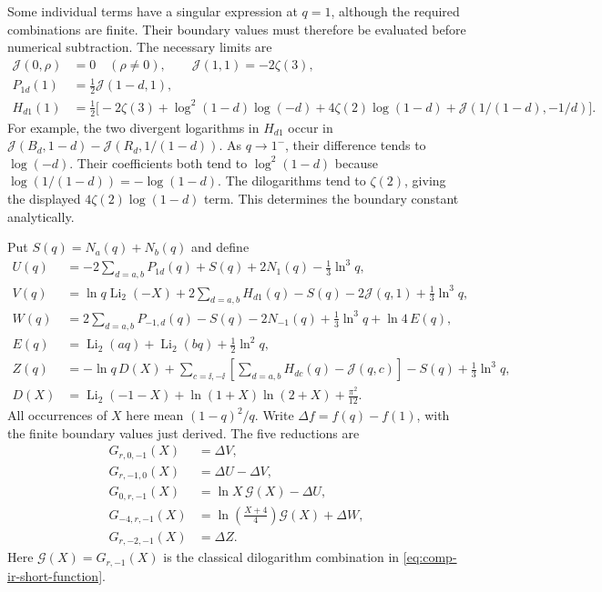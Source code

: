 Some individual terms have a singular expression at $q=1$, although
the required combinations are finite. Their boundary values must therefore
be evaluated before numerical subtraction. The necessary limits are
\begin{align}
 \mathcal J(0,\rho)&=0\quad(\rho\ne0),\qquad
 \mathcal J(1,1)=-2\zeta(3),\\
 P_{1d}(1)&=\tfrac12\mathcal J(1-d,1),\\
 H_{d1}(1)&=\tfrac12\bigl[-2\zeta(3)
       +\log^2(1-d)\log(-d)+4\zeta(2)\log(1-d)
       +\mathcal J(1/(1-d),-1/d)\bigr].
 \label{eq:comp-root-mixed-boundary}
\end{align}
For example, the two divergent logarithms in $H_{d1}$ occur in
$\mathcal J(B_d,1-d)-\mathcal J(R_d,1/(1-d))$.
As $q\to1^-$, their difference tends to $\log(-d)$.
Their coefficients both tend to $\log^2(1-d)$ because
$\log(1/(1-d))=-\log(1-d)$. The dilogarithms tend to
$\zeta(2)$, giving the displayed $4\zeta(2)\log(1-d)$ term.
This determines the boundary constant analytically.

Put $S(q)=N_a(q)+N_b(q)$ and define
\begin{align}
 U(q)&=-2\sum_{d=a,b}P_{1d}(q)+S(q)+2N_1(q)-\tfrac13\ln^3q,\\
 V(q)&=\ln q\operatorname{Li}_2(-X)
       +2\sum_{d=a,b}H_{d1}(q)-S(q)
       -2\mathcal J(q,1)+\tfrac13\ln^3q,\\
 W(q)&=2\sum_{d=a,b}P_{-1,d}(q)-S(q)-2N_{-1}(q)
       +\tfrac13\ln^3q+\ln4\,E(q),\\
 E(q)&=\operatorname{Li}_2(aq)+\operatorname{Li}_2(bq)
                 +\tfrac12\ln^2q,\\
 Z(q)&=-\ln q\,D(X)
       +\sum_{c=\ii,-\ii}\left[\sum_{d=a,b}H_{dc}(q)-\mathcal J(q,c)\right]
       -S(q)+\tfrac13\ln^3q,\\
 D(X)&=\operatorname{Li}_2(-1-X)+\ln(1+X)\ln(2+X)+\frac{\pi^2}{12}.
\end{align}
All occurrences of $X$ here mean $(1-q)^2/q$.
Write $\Delta f=f(q)-f(1)$, with the finite boundary values just derived.
The five reductions are
\begin{align}
 G_{r,0,-1}(X)&=\Delta V,\\
 G_{r,-1,0}(X)&=\Delta U-\Delta V,\\
 G_{0,r,-1}(X)&=\ln X\,\mathcal G(X)-\Delta U,\\
 G_{-4,r,-1}(X)&=\ln\!\left(\frac{X+4}{4}\right)\mathcal G(X)+\Delta W,\\
 G_{r,-2,-1}(X)&=\Delta Z.
 \label{eq:comp-root-five-classical}
\end{align}
Here $\mathcal G(X)=G_{r,-1}(X)$ is the classical dilogarithm
combination in \eqref{eq:comp-ir-short-function}.

